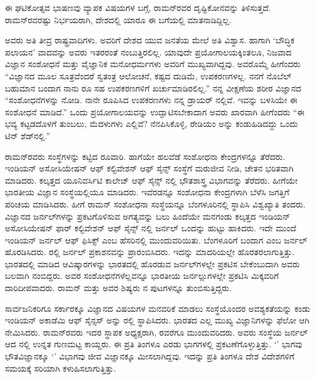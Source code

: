 ಈ ಘಟಿಕೋತ್ಸವ ಭಾಷಣವು ವ್ಯಾಪಕ ವಿಷಯಗಳ ಬಗ್ಗೆ, ರಾಮನ್‍ರವರ ದೃಷ್ಟಿಕೋನವನ್ನು ತಿಳಿಸುತ್ತದೆ. ರಾಮನ್‍ರವರಷ್ಟು ನಿರ್ಭಯರಾಗಿ, ದೇಶದಲ್ಲಿ ಯಾರೂ ಈ ಬಗೆಯಲ್ಲಿ ಮಾತನಾಡಿದ್ದಿಲ್ಲ.

ಅವರು ಅತಿ ತೀವ್ರ ರಾಷ್ಟ್ರವಾದಿಗಳು. ಅವರಿಗೆ ದೇಶದ ಯುವ ಜನತೆಯ ಮೇಲೆ ಅತಿ ವಿಶ್ವಾಸ. ಹಾಗಾಗಿ ‘ಬೌದ್ಧಿಕ ಪಲಾಯನ’ ವಾದವನ್ನು ಅವರು ಇತರರಂತೆ ನಂಬುತ್ತಿರಲಿಲ್ಲ. ಯಾವುದೇ ಪ್ರಯೋಗಾಲಯಕ್ಕಿಂತಲೂ, ನಿಜವಾದ ವಿಜ್ಞಾನ ಸಂಶೋಧನೆ ಮತ್ತು ವೈಜ್ಞಾನಿಕ ಮನೋಧರ್ಮಗಳು ಅವರಿಗೆ ಮುಖ್ಯವಾಗಿದ್ದವು. ಅವರೊಮ್ಮೆ ಹೀಗೆಂದರು\enginline{-} “ವಿಜ್ಞಾನದ ಮೂಲ ಸೂತ್ರವೆಂದರೆ ಸ್ವತಂತ್ರ ಆಲೋಚನೆ, ಕಷ್ಟದ ದುಡಿಮೆ, ಉಪಕರಣಗಳಲ್ಲ. ನನಗೆ ನೊಬೆಲ್ ಬಹುಮಾನ ಬಂದಾಗ ನಾನು  ರೂ ಸಹ ಉಪಕರಣಗಳಿಗೆ ಖರ್ಚುಮಾಡಿರಲಿಲ್ಲ.” ನನ್ನ ವೀಕ್ಷಣೆಯ ಶರೀರ ವಿಜ್ಞಾನದ “ಸಂಶೋಧನೆಗಳನ್ನು ನೋಡಿ. ನಾನೇ ರೂಪಿಸಿದ ಉಪಕರಣಗಳು ನನ್ನ ಡ್ರಾಯರ್ ನಲ್ಲಿವೆ. ಇವನ್ನು ಬಳಸಿಯೇ ಈ ಸಂಶೋಧನೆ ಮಾಡಿದೆ.” ಒಂದು ಪ್ರಯೋಗಾಲಯವನ್ನು ಉದ್ಘಾಟಿಸಬೇಕಾದಾಗ ಅವರು ಖಾರವಾಗಿ ಹೀಗೆಂದರು \enginline{-} “ಈ ಭವ್ಯ ಕಟ್ಟಡದೊಳಗೆ ತುಂಬಲು, ಮೆದಳುಗಳು ಎಲ್ಲಿವೆ? ನೆನಪಿಸಿಕೊಳ್ಳಿ, ರೇಡಿಯಂ ಅನ್ನು ಕಂಡುಹಿಡಿದದ್ದು ಒಂದು ಟಿನ್ ಶೆಡ್‍ನಲ್ಲಿ.”



ರಾಮನ್‍ರವರು ಸಂಸ್ಥೆಗಳನ್ನು ಕಟ್ಟಿದ ರೂವಾರಿ. ಹಾಗೆಯೇ ಹಲವೆಡೆ ಸಂಶೋಧನಾ ಕೇಂದ್ರಗಳನ್ನೂ ತೆರೆದರು. ಇಂಡಿಯನ್ ಅಸೋಸಿಯೇಷನ್ ಆಫ್ ಕಲ್ಟಿವೇಶನ್ ಆಫ್ ಸೈನ್ಸ್ ಸಂಸ್ಥೆಗೆ ಮರುಜೀವ ನೀಡಿ, ಚೇತನ ಭರಿತವಾಗಿ ಮಾಡಿದರು. ಕಲ್ಕತ್ತದ ಯೂನಿವರ್ಸಿಟಿ ಕಾಲೇಜ್ ಆಫ್ ಸೈನ್ಸ್ ನಲ್ಲಿ ಭೌತಶಾಸ್ತ್ರ ವಿಭಾಗವನ್ನು ತೆರೆದರು. ಹೀಗೆಯೇ ಭಾರತೀಯ ವಿಜ್ಞಾನ ಸಂಸ್ಥೆಯಲ್ಲಿಯೂ ಮಾಡಿದರು. ಇವೆರಡನ್ನೂ ಸಂಶೋಧನಾ ಕೇಂದ್ರಗಳಾಗಿ ಬೆಳೆಸಿ ಜಗತ್ತಿಗೆ ಪರಿಚಯ ಮಾಡಿಸಿದರು. ಹೀಗೆ ರಾಮನ್ ಸಂಶೋಧನಾ ಸಂಸ್ಥೆಯನ್ನೂ ಬೆಂಗಳೂರಿನಲ್ಲಿ ಸ್ಥಾಪಿಸಿ ವಿಶ್ವಖ್ಯಾತಿ ತಂದರು. ವಿಜ್ಞಾನದ ಜರ್ನಲ್‍ಗಳನ್ನು ಪ್ರಕಟಗೊಳಿಸುವ ಅಗತ್ಯವನ್ನು ಬಲು ಹಿಂದೆಯೇ ಮನಗಂಡು ಕಲ್ಕತ್ತದ ಇಂಡಿಯನ್ ಅಸೋಸಿಯೇಷನ್ ಫಾರ್ ಕಲ್ಟಿವೇಶನ್ ಆಫ್ ಸೈನ್ಸ್ ‍ನಲ್ಲಿ ಜರ್ನಲ್ ಒಂದನ್ನು ಹುಟ್ಟು ಹಾಕಿದರು. ಇದೇ ಮುಂದೆ ಇಂಡಿಯನ್ ಜರ್ನಲ್ ಆಫ್ ಫಿಸಿಕ್ಸ್ ಎಂಬ ಹೆಸರಿನಲ್ಲಿ ಮುಂದುವರಿಯಿತು. ಬೆಂಗಳೂರಿಗೆ ಬಂದಾಗ \textit{} ಎಂಬ ಜರ್ನಲ್ ಹೊರಡಿಸಿದರು. ರಲ್ಲಿ \textit{} ಜರ್ನಲ್ ಪ್ರಕಾಶನವನ್ನು ಪ್ರಾರಂಬಿಸಿದರು. ಇದನ್ನು \textit{} ಮಾದರಿಯಲ್ಲೇ ಹೊರತರಲಾಗುತ್ತಿತ್ತು. ಭಾರತದಲ್ಲಿ ಮಾಡಿದ ಆವಿಷ್ಕಾರಗಳನ್ನು ಭಾರತದಲ್ಲಿ ಹೊರಡುವ ಜರ್ನಲ್‍ಗಳಲ್ಲೇ ಪ್ರಕಟಿಸ ಬೇಕೆಂಬುದಾಗಿ ಅವರು ಬಲವಾಗಿ ನಂಬಿದ್ದರು. ಅವರ ಸಂಶೋಧನೆಗಳೆಲ್ಲವನ್ನೂ ಭಾರತೀಯ ಜರ್ನಲ್ಲುಗಳಲ್ಲೇ ಪ್ರಕಟಿಸಿ ಮಿಕ್ಕವರಿಗೆ ದಾರಿದೀಪವಾದರು. ರಾಮನ್ ಮತ್ತು ಅವರ ಶಿಷ್ಯರು \textit{} ನ ಪುಟಗಳನ್ನೂ ತುಂಬಿಸುತ್ತಿದ್ದರು.

ಸಾರ್ವಜನಿಕರಿಗೂ ಸರ್ಕಾರಕ್ಕೂ ವಿಜ್ಞಾನದ ವಿಷಯಗಳ ಮನವರಿಕೆ ಮಾಡಲು ಸಂಸ್ಥೆಯೊಂದರ ಅವಶ್ಯಕತೆಯನ್ನು ಕಂಡು ಇಂಡಿಯನ್ ಅಕಾಡೆಮಿ ಆಫ್ ಸೈನ್ಸಸ್ ಅನ್ನು ರಲ್ಲಿ ಸ್ಥಾಪಿಸಿದರು. ಭಾರತದ ಎಲ್ಲ ಮುಖ್ಯ ವಿಜ್ಞಾನಿಗಳನ್ನು ಫೆಲೋ ಆಗಿ ನೇಮಿಸಿದರು. ರಾಮನ್‍ರವರು ಇದರ ಸ್ಥಾಪಕ ಅಧ್ಯಕ್ಷರಾಗಿ,  ರವರೆಗೂ ಮುಂದುವರಿದರು. ಅವರು ಸಂಸ್ಥೆಯ ಜರ್ನಲ್ ಆದ  ನಲ್ಲಿ ಉನ್ನತ ಗುಣಮಟ್ಟ ಕಾಯ್ದರು. ಈ  ಪ್ರತಿ ತಿಂಗಳೂ ಎರಡು ಭಾಗಗಳಲ್ಲಿ ಪ್ರಕಟಣೆಗೊಳ್ಳುತ್ತಿತ್ತು. ‘’ ಭಾಗವು ಭೌತವಿಜ್ಞಾನಕ್ಕೂ ‘’ ವಿಭಾಗವು ಜೀವ ವಿಜ್ಞಾನಕ್ಕೂ ಮೀಸಲಾಗಿದ್ದವು. ಇದನ್ನು ಪ್ರತಿ ತಿಂಗಳೂ ದೇಶ ವಿದೇಶಗಳಿಗೆ ಸಮಯಕ್ಕೆ ಸರಿಯಾಗಿ ಕಳುಹಿಸಲಾಗುತ್ತಿತ್ತು.

